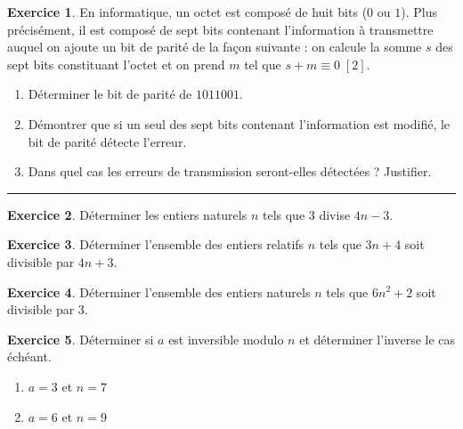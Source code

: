 \documentclass{exam}
\theoremstyle{definition}
\newtheorem{exercice}{Exercice}
\begin{document}
    \begin{exercice}
        En informatique, un octet est composé de huit bits ($0$ ou $1$). Plus précisément, il est composé de sept bits contenant l’information à transmettre auquel on ajoute un bit de parité de la façon suivante : on calcule la somme $s$ des sept bits constituant l’octet et on prend $m$ tel que $s + m \equiv 0 \; [2]$.
        \begin{enumerate}
            \item Déterminer le bit de parité de $1011001$.
            \item Démontrer que si un seul des sept bits contenant l’information est modifié, le bit de parité détecte l’erreur.
            \item Dans quel cas les erreurs de transmission seront-elles détectées ? Justifier.
        \end{enumerate}
    \end{exercice}
    
    \vfill

    \hrule

    \vfill


    \vspace{2mm}


    \vspace{2mm}

    \begin{exercice}
    Déterminer les entiers naturels $n$ tels que $3$ divise $4n - 3$.
    \end{exercice}
    
    \begin{exercice}
    Déterminer l’ensemble des entiers relatifs $n$ tels que $3n + 4$ soit divisible par $4n + 3$.
    \end{exercice}
    
    \begin{exercice}
    Déterminer l’ensemble des entiers naturels $n$ tels que $6n^2 + 2$ soit divisible par $3$.
    \end{exercice}
    
    \begin{exercice}
    Déterminer si $a$ est inversible modulo $n$ et déterminer l’inverse le cas échéant.
    \begin{enumerate}
        \item $a = 3$ et $n = 7$
        \item $a = 6$ et $n = 9$
    \end{enumerate}
    \end{exercice}
    
\end{document}
